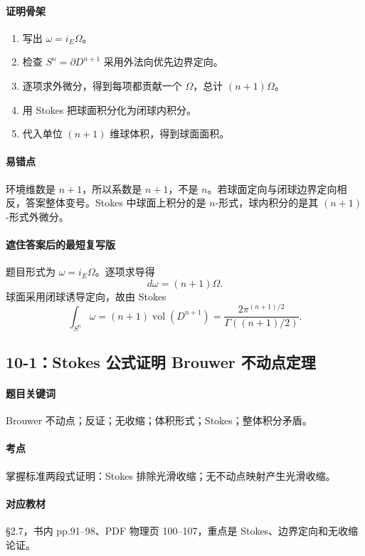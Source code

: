 \documentclass[12pt,a4paper]{ctexart}
\newcommand{\vol}{\operatorname{vol}}
\begin{document}
\paragraph{证明骨架}
\begin{enumerate}
  \item 写出 $\omega=i_E\Omega$。
  \item 检查 $S^n=\partial D^{n+1}$ 采用外法向优先边界定向。
  \item 逐项求外微分，得到每项都贡献一个 $\Omega$，总计 $(n+1)\Omega$。
  \item 用 Stokes 把球面积分化为闭球内积分。
  \item 代入单位 $(n+1)$ 维球体积，得到球面面积。
\end{enumerate}

\paragraph{易错点}
环境维数是 $n+1$，所以系数是 $n+1$，不是 $n$。若球面定向与闭球边界定向相反，答案整体变号。Stokes 中球面上积分的是 $n$-形式，球内积分的是其 $(n+1)$-形式外微分。

\paragraph{遮住答案后的最短复写版}
题目形式为 $\omega=i_E\Omega$。逐项求导得
\[
  d\omega=(n+1)\Omega.
\]
球面采用闭球诱导定向，故由 Stokes
\[
  \int_{S^n}\omega=(n+1)\vol(D^{n+1})
  =\frac{2\pi^{(n+1)/2}}{\Gamma((n+1)/2)}.
\]

\subsection{10-1：Stokes 公式证明 Brouwer 不动点定理}

\paragraph{题目关键词}
Brouwer 不动点；反证；无收缩；体积形式；Stokes；整体积分矛盾。

\paragraph{考点}
掌握标准两段式证明：Stokes 排除光滑收缩；无不动点映射产生光滑收缩。

\paragraph{对应教材}
\S 2.7，书内 pp.91--98、PDF 物理页 100--107，重点是 Stokes、边界定向和无收缩论证。
\end{document}
